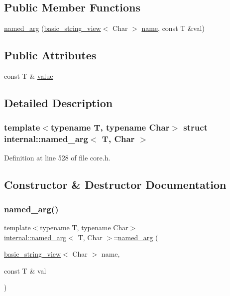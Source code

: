\subsection*{Public Member Functions}
\begin{DoxyCompactItemize}
\item 
\hyperlink{structinternal_1_1named__arg_ada4a6386921114e321347031d2832969}{named\+\_\+arg} (\hyperlink{classbasic__string__view}{basic\+\_\+string\+\_\+view}$<$ Char $>$ \hyperlink{structinternal_1_1named__arg__base_a06a112fdd55d3e5ad86d0d1c343e63e0}{name}, const T \&val)
\end{DoxyCompactItemize}
\subsection*{Public Attributes}
\begin{DoxyCompactItemize}
\item 
const T \& \hyperlink{structinternal_1_1named__arg_aa97a74474c2c98dbcb5dbad098b6673b}{value}
\end{DoxyCompactItemize}


\subsection{Detailed Description}
\subsubsection*{template$<$typename T, typename Char$>$\newline
struct internal\+::named\+\_\+arg$<$ T, Char $>$}



Definition at line 528 of file core.\+h.



\subsection{Constructor \& Destructor Documentation}
\mbox{\label{structinternal_1_1named__arg_ada4a6386921114e321347031d2832969}} 
\subsubsection{\texorpdfstring{named\+\_\+arg()}{named\_arg()}}
{\footnotesize\ttfamily template$<$typename T, typename Char$>$ \\
\hyperlink{structinternal_1_1named__arg}{internal\+::named\+\_\+arg}$<$ T, Char $>$\+::\hyperlink{structinternal_1_1named__arg}{named\+\_\+arg} (\begin{DoxyParamCaption}\item[{\hyperlink{classbasic__string__view}{basic\+\_\+string\+\_\+view}$<$ Char $>$}]{name,  }\item[{const T \&}]{val }\end{DoxyParamCaption})\hspace{0.3cm}{\ttfamily [inline]}}



